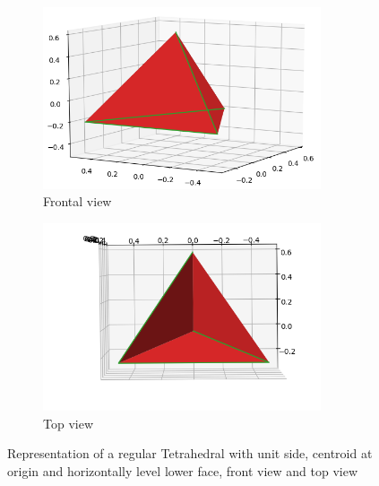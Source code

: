 \begin{figure}[H]
    \centering
    \begin{subfigure}[b]{0.48\textwidth}
    \centering
    \includegraphics[width=0.9\textwidth]{Figures/unit_tetra.png}
    \caption{Frontal view}
    \label{fig:d1}
\end{subfigure}
\hfill
\begin{subfigure}[b]{0.48\textwidth}
    \centering
    \includegraphics[width=0.9\textwidth]{Figures/unit_tetra_top.png}
    \caption{Top view}
    \label{fig:d2}
\end{subfigure}
    \caption{Representation of a regular Tetrahedral with unit side, centroid at origin and horizontally level lower face, front view and top view}
    \label{fig:regulartetra}
\end{figure}

